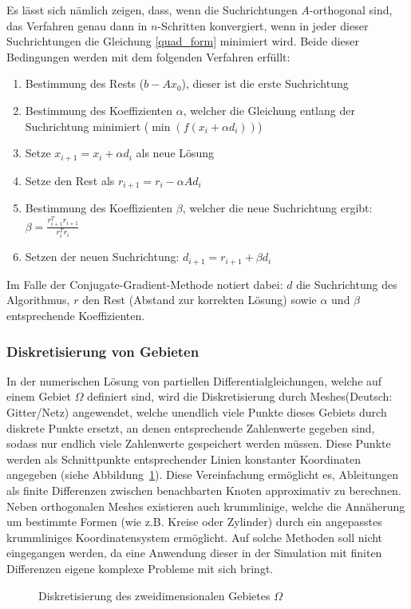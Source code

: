 Es lässt sich nämlich zeigen, dass, wenn die Suchrichtungen $A$-orthogonal sind, das Verfahren genau dann in $n$-Schritten konvergiert, wenn in jeder dieser Suchrichtungen die Gleichung \eqref{quad_form} minimiert wird. Beide dieser Bedingungen werden mit dem folgenden Verfahren erfüllt: 
\begin{enumerate}
    \item Bestimmung des Rests ($b-Ax_0$), dieser ist die erste Suchrichtung \\
    \item Bestimmung des Koeffizienten $\alpha$, welcher die Gleichung entlang der Suchrichtung minimiert ($\min(f(x_i + \alpha d_i))$) \\
    \item Setze $x_{i+1} = x_i + \alpha d_i$ als neue Lösung \\
    \item Setze den Rest als $r_{i+1} = r_i - \alpha Ad_i$ \\
    \item Bestimmung des Koeffizienten $\beta$, welcher die neue Suchrichtung ergibt: $\beta = \frac{r_{i+1}^T r_{i+1}}{r_i^T r_i}$ \\
    \item Setzen der neuen Suchrichtung: $d_{i+1} = r_{i+1} + \beta d_i$ \\
\end{enumerate}
Im Falle der Conjugate-Gradient-Methode notiert dabei: $d$ die Suchrichtung des Algorithmus, $r$ den Rest (Abstand zur korrekten Lösung) sowie $\alpha$ und $\beta$ entsprechende Koeffizienten.


\subsubsection{Diskretisierung von Gebieten}

In der numerischen Lösung von partiellen Differentialgleichungen, welche auf einem Gebiet $\Omega$ definiert sind, wird die Diskretisierung durch \glqq Meshes\grqq (Deutsch: Gitter/Netz) angewendet, welche unendlich viele Punkte dieses Gebiets durch diskrete Punkte ersetzt, an denen entsprechende Zahlenwerte gegeben sind, sodass nur endlich viele Zahlenwerte gespeichert werden müssen. Diese Punkte werden als Schnittpunkte entsprechender Linien konstanter Koordinaten angegeben (siehe Abbildung~\ref{fig:meshs}). Diese Vereinfachung ermöglicht es, Ableitungen als finite Differenzen zwischen benachbarten Knoten approximativ zu berechnen. Neben orthogonalen Meshes existieren auch krummlinige, welche die Annäherung um bestimmte Formen (wie z.B. Kreise oder Zylinder) durch ein angepasstes krummliniges Koordinatensystem ermöglicht. Auf solche Methoden soll nicht eingegangen werden, da eine Anwendung dieser in der Simulation mit finiten Differenzen eigene komplexe Probleme mit sich bringt.
\begin{figure}
    \centering
    \def\svgwidth{0.75\textwidth}
    
    \caption{Diskretisierung des zweidimensionalen Gebietes $\Omega$}
    \label{fig:meshs}
\end{figure}

